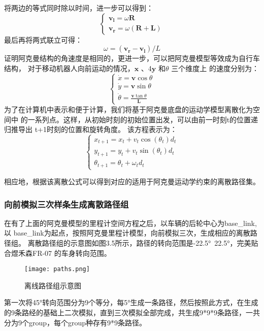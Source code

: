 将两边的等式同时除以时间，进一步可以得到：
\begin{equation}
    \begin{cases}
        \symbf{v}_{\symbf{l}} = \omega  \symbf{R}\\
        \symbf{v}_{\symbf{r}} = \omega (\symbf{R} + \symbf{L})        
    \end{cases}
\end{equation}
最后再将两式联立可得：
\begin{equation}
    \omega = ( \symbf{v}_{\symbf{r}}- \symbf{v}_{\symbf{l}}) / L
\end{equation}
证明阿克曼结构的角速度是相同的，更进一步，可以把阿克曼模型等效成为自行车结构，
对于移动机器人向前运动的情况，$\symbf{x}$ 、4$\symbf{y}$ 和$\theta$ 三个维度上
的速度分别为：
\begin{equation}
    \begin{cases}
        \dot{x} = \symbf{v}\cos \theta \\
        \dot{y} = \symbf{v}\sin \theta \\
        \dot{\theta } = \frac{\symbf{v}\tan \theta}{\symbf{L}}
    \end{cases}
\end{equation}
为了在计算机中表示和便于计算，我们将基于阿克曼底盘的运动学模型离散化为空间中
的一系列点。这样，从初始时刻的初始位置出发，可以由前一时刻t的位置递归推导出
t+1时刻的位置和旋转角度。 该方程表示为：
\begin{equation}
    \begin{cases}
       x_{t+1} = x_{t} + v_{t}\cos(\theta _{t})d_{t}\\
       y_{t+1} = y_{t} + v_{t}\sin(\theta _{t})d_{t}\\
       \theta_{t+1} = \theta_{t} + \omega_{t}d_{t}
    \end{cases}
\end{equation}

相应地，根据该离散公式可以得到对应的适用于阿克曼运动学约束的离散路径集。

\subsubsection{向前模拟三次样条生成离散路径组}

在有了上面的阿克曼模型的里程计空间方程之后，以车辆的后轮中心为base\_link,以
base\_link为起点，按照阿克曼里程计模型，向前模拟三次，生成相应的离散路径组。
离散路径组的示意图如图3.5所示，路径的转向范围是-22.5°~22.5°，完美贴合煜禾森FR-07
的车身转向范围。
\begin{figure}[ht]
    \centering
    \texttt{[image: paths.png]}
    \caption{离线路径组示意图}
\end{figure}
第一次将45°转向范围分为9个等分，每5°生成一条路径，然后按照此方式，在生成的9条路经的基础上二次模拟，直到三次模拟全部完成，共生成9*9*9条路径，一共分为9个group，每个group种存有9*9条路径。

